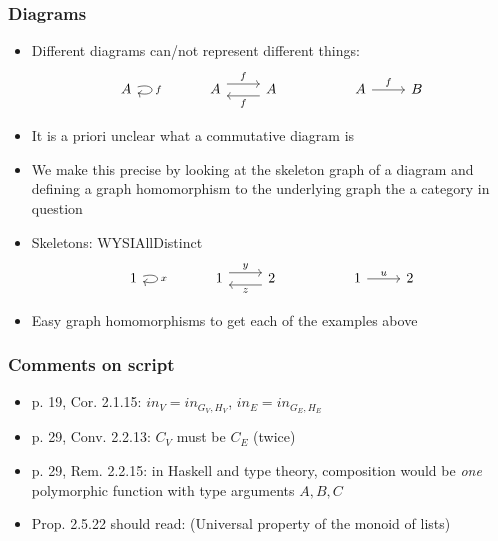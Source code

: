 \documentclass[handout]{beamer}
\begin{document}
\frame
  {   
    \frametitle{Diagrams}\label{Ch2:Diagrams}

 \begin{itemize}[<+->]
\item Different diagrams can/not represent different things:
\[
\begin{tikzcd}[ampersand replacement=\&]
A\arrow[loop right]{l}{f} \& \&
A \arrow[yshift=1ex]{r}{f} \& A \arrow[yshift=-1ex]{l}{f}  \& \&
A \arrow{r}{f} \& B
\end{tikzcd}
\]
\item It is a priori unclear what a commutative diagram is
\item We make this precise by looking at the skeleton graph  of a
diagram and defining a graph homomorphism to the underlying graph the
a category in question
\item  Skeletons: WYSIAllDistinct
\[
\begin{tikzcd}[ampersand replacement=\&]
1\arrow[loop right]{l}{x} \& \&
1 \arrow[yshift=1ex]{r}{y} \& 2 \arrow[yshift=-1ex]{l}{z}  \& \&
1 \arrow{r}{u} \& 2
\end{tikzcd}
\]
\item Easy graph homomorphisms to get each of the examples above
 \end{itemize}

 }

\frame
  {   
    \frametitle{Comments on script}\label{Ch2:comments}

 \begin{itemize}[<+->]
\item p. 19, Cor. 2.1.15: $in_V = in_{G_V,H_V}$, $in_E = in_{G_E,H_E}$
\item p. 29, Conv. 2.2.13: $C_V$ must be $C_E$ (twice)
\item p. 29, Rem. 2.2.15: in Haskell and type theory, composition would be
\emph{one} polymorphic function with type arguments $A,B,C$
\item Prop. 2.5.22 should read: (Universal property of the monoid of lists) 
 \end{itemize}

 }
\end{document}
